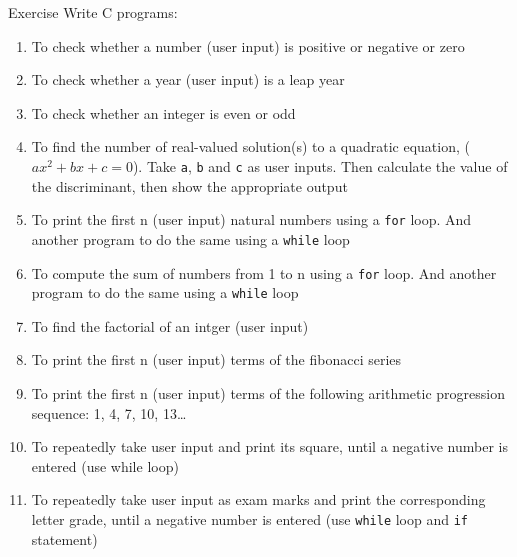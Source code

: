 \documentclass[12pt, aspectratio=169]{beamer}
\begin{document}
    \begin{frame}[allowframebreaks=0.75]{Exercise}
        Write C programs:
        \begin{enumerate}
            \item To check whether a number (user input) is positive or negative or zero
            \item To check whether a year (user input) is a leap year
            \item To check whether an integer is even or odd
            \item To find the number of real-valued solution(s) to a quadratic equation, (\(ax^2+bx+c=0\)). Take \texttt{a}, \texttt{b} and \texttt{c} as user inputs. Then calculate the value of the discriminant, then show the appropriate output
            \item To print the first n (user input) natural numbers using a \texttt{for} loop. And another program to do the same using a \texttt{while} loop
            \item To compute the sum of numbers from 1 to n using a \texttt{for} loop. And another program to do the same using a \texttt{while} loop
            \item To find the factorial of an intger (user input)
            \item To print the first n (user input) terms of the fibonacci series
            \item To print the first n (user input) terms of the following arithmetic progression sequence: 1, 4, 7, 10, 13\dots
            \item To repeatedly take user input and print its square, until a negative number is entered (use while loop)
            \item To repeatedly take user input as exam marks and print the corresponding letter grade, until a negative number is entered (use \texttt{while} loop and \texttt{if} statement)
        \end{enumerate}
    \end{frame}
\end{document}

